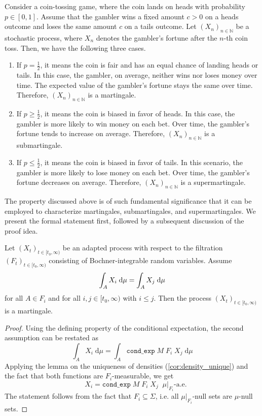 \begin{example}
Consider a coin-tossing game, where the coin lands on heads with probability $p \in [0,1]$. Assume that the gambler wins a fixed amount $c > 0$ on a heads outcome and loses the same amount $c$ on a tails outcome. Let $(X_n)_{n \in \mathbb{N}}$ be a stochastic process, where $X_n$ denotes the gambler's fortune after the $n$-th coin toss. Then, we have the following three cases.
\begin{enumerate}
\item If $p = \frac{1}{2}$, it means the coin is fair and has an equal chance of landing heads or tails. In this case, the gambler, on average, neither wins nor loses money over time. The expected value of the gambler's fortune stays the same over time. Therefore, $(X_n)_{n \in \mathbb{N}}$ is a martingale.
\item If $p \ge \frac{1}{2}$, it means the coin is biased in favor of heads. In this case, the gambler is more likely to win money on each bet. Over time, the gambler's fortune tends to increase on average. Therefore, $(X_n)_{n \in \mathbb{N}}$ is a submartingale.
\item If $p \le \frac{1}{2}$, it means the coin is biased in favor of tails. In this scenario, the gambler is more likely to lose money on each bet. Over time, the gambler's fortune decreases on average. Therefore, $(X_n)_{n \in \mathbb{N}}$ is a supermartingale.
\end{enumerate}
\end{example}

The property discussed above is of such fundamental significance that it can be employed to characterize martingales, submartingales, and supermartingales. We present the formal statement first, followed by a subsequent discussion of the proof idea.

\begin{lemma}
	Let $(X_t)_{t \in [t_0,\infty)}$ be an adapted process with respect to the filtration $(F_t)_{t \in [t_0,\infty)}$ consisting of Bochner-integrable random variables.
  Assume 
  \[
  \normalfont \int_A X_i \;\textrm{d}\mu = \int_A X_j \;\textrm{d}\mu
  \] 
  for all $A \in F_i$ and for all $i,j \in [t_0,\infty)$ with $i \le j$. Then the process $(X_t)_{t \in [t_0,\infty)}$ is a martingale.
\end{lemma}
\begin{proof}
Using the defining property of the conditional expectation, the second assumption can be restated as
\[
	\int_A X_i \;\textrm{d}\mu = \int_A \texttt{cond\_exp} \; M \; F_i \; X_j \;\textrm{d}\mu
\]
Applying the lemma on the uniqueness of densities (\ref{cor:density_unique}) and the fact that both functions are $F_i$-measurable, we get
\[
	\quad X_i = \texttt{cond\_exp} \; M \; F_i \; X_j \;\; \mu\vert_{F_i}\textrm{-a.e.}
\]
The statement follows from the fact that $F_i \subseteq \Sigma$, i.e. all $\mu\vert_{F_i}$-null sets are $\mu$-null sets. 
\end{proof}

